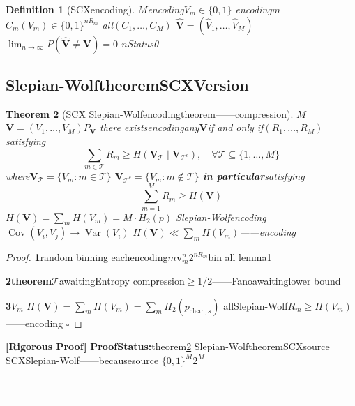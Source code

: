 \documentclass[11pt,a4paper]{article}
\newtheorem{theorem}{Theorem}[section]
\newtheorem{definition}[theorem]{Definition}
\theoremstyle{remark}
\DeclareMathOperator{\Cov}{Cov}
\DeclareMathOperator{\Var}{Var}
\newcommand{\rigorous}{\textnormal{\textbf{[Rigorous Proof]}}}
\begin{document}
\begin{definition}[SCXencoding]
\label{def:distributed_coding}
$M$encoding$V_m \in \{0,1\}$
encoding$m$$C_m(V_m) \in \{0,1\}^{nR_m}$
all$(C_1, \ldots, C_M)$
$\hat{\mathbf{V}} = (\hat{V}_1, \ldots, \hat{V}_M)$
$\lim_{n \to \infty} P(\hat{\mathbf{V}} \neq \mathbf{V}) = 0$
$n$Status0
\end{definition}

\subsection{Slepian-WolftheoremSCXVersion}

\begin{theorem}[SCX Slepian-Wolfencodingtheorem——compression]
\label{thm:slepian_wolf_scx}
$M$$\mathbf{V} = (V_1, \ldots, V_M)$$P_{\mathbf{V}}$
there existsencodingany$\mathbf{V}$if and only if$(R_1, \ldots, R_M)$satisfying
\begin{equation}
    \boxed{\sum_{m \in \mathcal{T}} R_m \geq H(\mathbf{V}_\mathcal{T} \mid \mathbf{V}_{\mathcal{T}^c}),
    \quad \forall \mathcal{T} \subseteq \{1, \ldots, M\}}
\end{equation}
where$\mathbf{V}_\mathcal{T} = \{V_m : m \in \mathcal{T}\}$
$\mathbf{V}_{\mathcal{T}^c} = \{V_m : m \notin \mathcal{T}\}$
\textbf{in particular}satisfying
\begin{equation}
    \boxed{\sum_{m=1}^{M} R_m \geq H(\mathbf{V})}
\end{equation}
$H(\mathbf{V}) = \sum_{m} H(V_m) = M \cdot H_2(p)$
Slepian-Wolfencoding
$\Cov(V_i, V_j) \to \Var(V_i)$
$H(\mathbf{V}) \ll \sum_m H(V_m)$——encoding
\end{theorem}

\begin{proof}
\textbf{1}random binning
eachencoding$m$$\mathbf{v}_m^n$$2^{nR_m}$bin
all
lemma1

\textbf{2theorem}$\mathcal{T}$awaitingEntropy
compression$\geq 1/2$——Fanoawaitinglower bound

\textbf{3}$V_m$
$H(\mathbf{V}) = \sum_m H(V_m) = \sum_m H_2(p_{\text{clean},s})$
allSlepian-Wolf$R_m \geq H(V_m)$——encoding
\hfill $\square$
\end{proof}

\rigorous{} \textbf{ProofStatus:}theorem\ref{thm:slepian_wolf_scx}
Slepian-Wolftheorem\cite{slepian1973}SCXsource
SCXSlepian-Wolf——because\textbf{}source
$\{0,1\}^M$$2^M$

\subsection{——}
\end{document}
